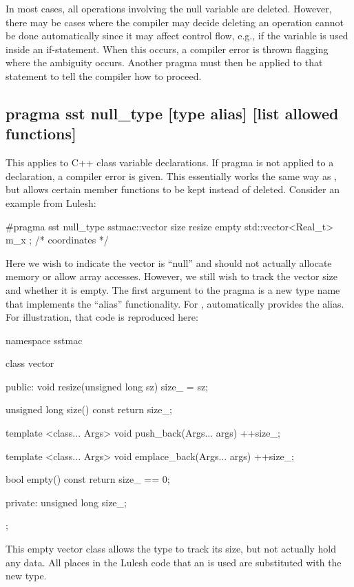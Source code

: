 In most cases, all operations involving the null variable are deleted.
However, there may be cases where the compiler may decide deleting an operation cannot be done automatically since
it may affect control flow, e.g., if the variable is used inside an if-statement.
When this occurs, a compiler error is thrown flagging where the ambiguity occurs.
Another pragma must then be applied to that statement to tell the compiler how to proceed.

\subsection{pragma sst null\_type [type alias] [list allowed functions]}
This applies to C++ class variable declarations. If pragma is not applied to a declaration, a compiler error is given.
This essentially works the same way as , but allows certain member functions to be kept instead of deleted.
Consider an example from Lulesh:

\begin{CppCode}
#pragma sst null_type sstmac::vector size resize empty
   std::vector<Real_t> m_x ;  /* coordinates */
\end{CppCode} 
Here we wish to indicate the vector is ``null'' and should not actually allocate memory or allow array accesses.
However, we still wish to track the vector size and whether it is empty.
The first argument to the pragma is a new type name that implements the ``alias'' functionality.
For , \sstmacro automatically provides the alias.
For illustration, that code is reproduced here:

\begin{CppCode}
namespace sstmac {
class vector {
 public:
  void resize(unsigned long sz){
    size_ = sz;
  }

  unsigned long size() const {
    return size_;
  }

  template <class... Args>
  void push_back(Args... args){
    ++size_;
  }

  template <class... Args>
  void emplace_back(Args... args){
    ++size_;
  }

  bool empty() const {
    return size_ == 0;
  }

 private:
  unsigned long  size_;
};
}
\end{CppCode}
This empty vector class allows the type to track its size, but not actually hold any data.
All places in the Lulesh code that an  is used are substituted with the new type.


